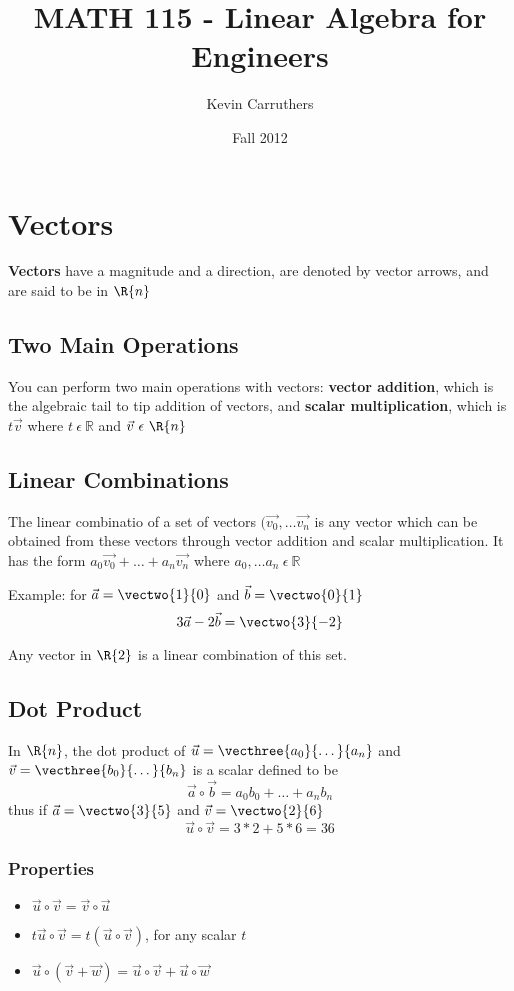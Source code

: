 \documentclass[12pt]{article}
\begin{document}
\title{MATH 115 - Linear Algebra for Engineers}
\author{Kevin Carruthers}
\date{\vspace{-2ex}Fall 2012}
\maketitle\HRule

\section*{Vectors}
{\bf Vectors} have a magnitude and a direction, are denoted by vector arrows, and are said to be in $\R{n}$

\subsection*{Two Main Operations}
You can perform two main operations with vectors: {\bf vector addition}, which is the algebraic tail to tip addition of vectors, and {\bf scalar multiplication}, which is $t\vec{v}$ where $t\ \epsilon\ \mathbb{R}$ and $\vec{v}\ \epsilon\ \R{n}$

\subsection*{Linear Combinations}
The linear combinatio of a set of vectors $(\vec{v_0},\dots \vec{v_n}$ is any vector which can be obtained from these vectors through vector addition and scalar multiplication. It has the form $a_0\vec{v_0} + \dots + a_n\vec{v_n}$ where $a_0,\dots a_n\ \epsilon\ \mathbb{R}$

Example: for $\vec{a} = \vectwo{1}{0}$ and $\vec{b} = \vectwo{0}{1}$
\[ 3\vec{a} - 2\vec{b} = \vectwo{3}{-2} \]

Any vector in $\R{2}$ is a linear combination of this set.

\subsection*{Dot Product}
In $\R{n}$, the dot product of $\vec{u} = \vecthree{a_0}{\dots}{a_n}$ and $\vec{v} = \vecthree{b_0}{\dots}{b_n}$ is a scalar defined to be \[ \vec{a}\circ\vec{b} = a_0b_0 + \dots + a_nb_n \] thus if $\vec{a} = \vectwo{3}{5}$ and $\vec{v} = \vectwo{2}{6}$ \[ \vec{u}\circ\vec{v} = 3*2 + 5*6 = 36 \]

\subsubsection*{Properties}
\begin{itemize}
\item $\vec{u}\circ\vec{v} = \vec{v}\circ\vec{u}$
\item $t\vec{u}\circ\vec{v} = t(\vec{u}\circ\vec{v})$, for any scalar $t$
\item $\vec{u}\circ(\vec{v} + \vec{w}) = \vec{u}\circ\vec{v} + \vec{u}\circ\vec{w}$
\end{itemize}
\end{document}
